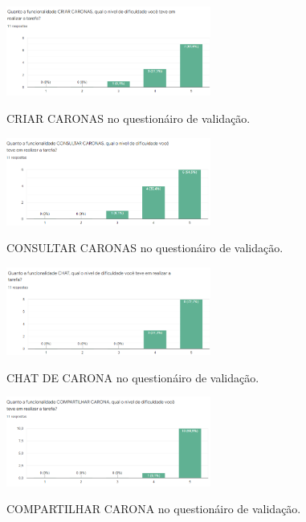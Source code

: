 \begin{figure}[H]
	\centering
	\caption{CRIAR CARONAS no questionáiro de validação.}
	\includegraphics[width=0.6\textwidth]{./04-figuras/validacao/criar_caronas.png}
	\label{fig:criar_caronas}
\end{figure}

\begin{figure}[H]
	\centering
	\caption{CONSULTAR CARONAS no questionáiro de validação.}
	\includegraphics[width=0.6\textwidth]{./04-figuras/validacao/consultar_caronas.png}
	\label{fig:consultar_caronas}
\end{figure}

\begin{figure}[H]
	\centering
	\caption{CHAT DE CARONA no questionáiro de validação.}
	\includegraphics[width=0.6\textwidth]{./04-figuras/validacao/chat.png}
	\label{fig:consultar_caronas}
\end{figure}

\begin{figure}[H]
	\centering
	\caption{COMPARTILHAR CARONA no questionáiro de validação.}
	\includegraphics[width=0.6\textwidth]{./04-figuras/validacao/compartilhar_caronas.png}
	\label{fig:compartilhar_carna}
\end{figure}

